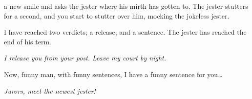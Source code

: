 a new smile and asks the jester where his mirth has gotten to.
The jester stutters for a second, and you start to stutter over him, mocking the jokeless jester.

\begin{speechtext}
  I have reached two verdicts; a release, and a sentence.
  The jester has reached the end of his term.

  \emph{I release you from your post.  Leave my court by night.}

  Now, funny man, with funny sentences, I have a funny sentence for you\ldots

  \emph{Jurors, meet the newest jester!}
\end{speechtext}

